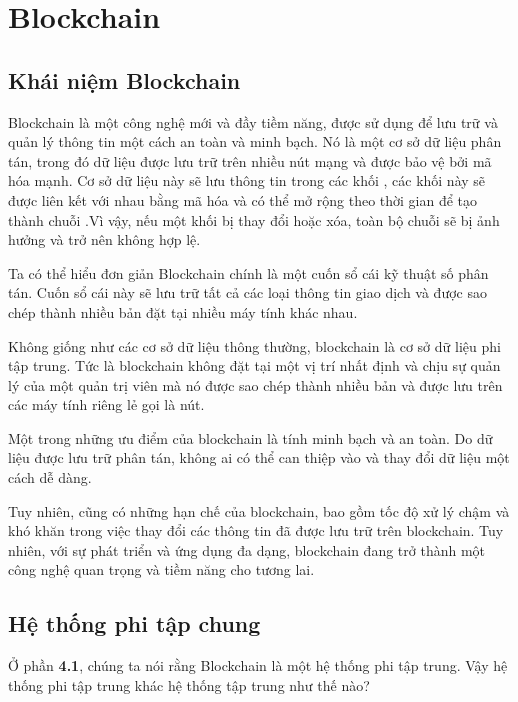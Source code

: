 \section{Blockchain}
\subsection{Khái niệm Blockchain}

Blockchain là một công nghệ mới và đầy tiềm năng, được sử dụng để lưu 
trữ và quản lý thông tin một cách an toàn và minh bạch. Nó là một cơ 
sở dữ liệu phân tán, trong đó dữ liệu được lưu trữ trên nhiều nút 
mạng và được bảo vệ bởi mã hóa mạnh. Cơ sở dữ liệu này sẽ lưu thông tin trong các khối , các khối 
này sẽ được liên kết với nhau bằng mã hóa và có thể mở rộng theo 
thời gian để tạo thành chuỗi .Vì vậy, 
nếu một khối bị thay đổi hoặc xóa, toàn bộ chuỗi sẽ bị ảnh 
hưởng và trở nên không hợp lệ.

Ta có thể hiểu đơn giản Blockchain chính là một cuốn sổ cái kỹ thuật 
số phân tán. Cuốn sổ cái này sẽ lưu trữ tất cả các loại thông tin 
giao dịch và được sao chép thành nhiều bản đặt tại nhiều máy tính khác nhau. 

Không giống như các cơ sở dữ liệu thông thường, blockchain là cơ sở dữ liệu phi tập trung. 
Tức là blockchain không đặt tại một vị trí nhất định và chịu sự quản lý của một quản trị viên mà nó được sao chép thành nhiều bản và được lưu trên các máy tính riêng lẻ gọi là nút. 


Một trong những ưu điểm của blockchain là tính minh bạch và an toàn. 
Do dữ liệu được lưu trữ phân tán, không ai có thể can thiệp vào và 
thay đổi dữ liệu một cách dễ dàng.

Tuy nhiên, cũng có những hạn chế của blockchain, bao gồm tốc độ xử 
lý chậm và khó khăn trong việc thay đổi các thông tin đã được lưu 
trữ trên blockchain. Tuy nhiên, với sự phát triển và ứng dụng đa 
dạng, blockchain đang trở thành một công nghệ quan trọng và tiềm 
năng cho tương lai.
\subsection{Hệ thống phi tập chung}

Ở phần \textbf{4.1}, chúng ta nói rằng Blockchain là một hệ thống 
phi tập trung. Vậy hệ thống phi tập trung khác hệ thống tập trung
như thế nào?

